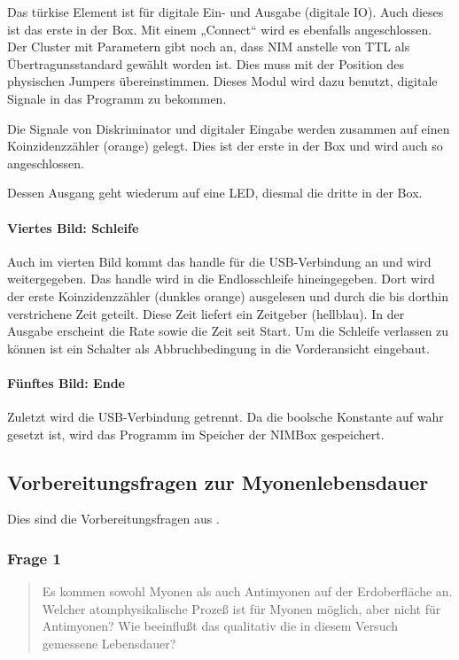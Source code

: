 \documentclass[11pt, ngerman, fleqn, DIV=15, headinclude, BCOR=2cm]{scrreprt}
\begin{document}
Das türkise Element ist für digitale Ein- und Ausgabe (digitale IO). Auch
dieses ist das erste in der Box. Mit einem „Connect“ wird es ebenfalls
angeschlossen. Der Cluster mit Parametern gibt noch an, dass NIM anstelle von
TTL als Übertragunsstandard gewählt worden ist. Dies muss mit der Position des
physischen Jumpers übereinstimmen. Dieses Modul wird dazu benutzt, digitale
Signale in das Programm zu bekommen.

Die Signale von Diskriminator und digitaler Eingabe werden zusammen auf einen
Koinzidenzzähler (orange) gelegt. Dies ist der erste in der Box und wird auch
so angeschlossen.

Dessen Ausgang geht wiederum auf eine LED, diesmal die dritte in der Box.

\paragraph{Viertes Bild: Schleife}

Auch im vierten Bild kommt das handle für die USB-Verbindung an und wird
weitergegeben. Das handle wird in die Endlosschleife hineingegeben. Dort wird
der erste Koinzidenzzähler (dunkles orange) ausgelesen und durch die bis
dorthin verstrichene Zeit geteilt. Diese Zeit liefert ein Zeitgeber (hellblau).
In der Ausgabe erscheint die Rate sowie die Zeit seit Start. Um die Schleife
verlassen zu können ist ein Schalter als Abbruchbedingung in die Vorderansicht
eingebaut.

\paragraph{Fünftes Bild: Ende}

Zuletzt wird die USB-Verbindung getrennt. Da die boolsche Konstante auf wahr
gesetzt ist, wird das Programm im Speicher der NIMBox gespeichert.

\subsection{Vorbereitungsfragen zur Myonenlebensdauer}

Dies sind die Vorbereitungsfragen aus \parencite[14]{physik512-Anleitung}.

\subsubsection{Frage 1}

\begin{quote}
    Es kommen sowohl Myonen als auch Antimyonen auf der Erdoberfläche an.
    Welcher atomphysikalische Prozeß ist für Myonen möglich, aber nicht für
    Antimyonen? Wie beeinflußt das qualitativ die in diesem Versuch gemessene
    Lebensdauer?
\end{quote}
\end{document}
